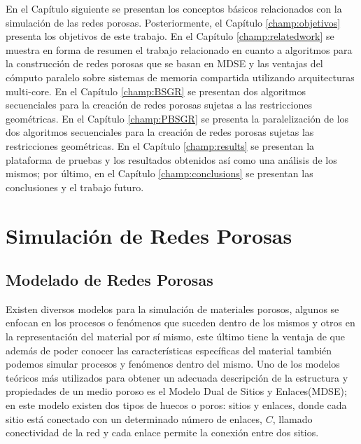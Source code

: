
En el Cap\'itulo siguiente se presentan los conceptos b\'asicos relacionados con la simulaci\'on de las redes porosas. Posteriormente, el Cap\'itulo \ref{champ:objetivos} presenta los objetivos de este trabajo. En el Capítulo \ref{champ:relatedwork} se muestra en forma de resumen el trabajo relacionado en cuanto a algoritmos para la construcción de redes porosas que se basan en MDSE y las ventajas del c\'omputo paralelo sobre sistemas de memoria compartida utilizando arquitecturas multi-core. En el Capítulo \ref{champ:BSGR} se presentan dos algoritmos secuenciales para la creación de redes porosas sujetas a las restricciones geométricas. En el Capítulo \ref{champ:PBSGR} se presenta la paralelización de los dos algoritmos secuenciales para la creación de redes porosas sujetas las restricciones geométricas. En el Capítulo \ref{champ:results} se presentan la plataforma de pruebas y los resultados obtenidos así como una análisis de los mismos; por último, en el Capítulo \ref{champ:conclusions} se presentan las conclusiones y el trabajo futuro.


\chapter{Simulaci\'on de Redes Porosas}
\label{champ:construction}
\bigskip
\barra
\bigskip


\section{Modelado de Redes Porosas}
\label{sec:model}
Existen diversos modelos para la simulación de materiales porosos, algunos se enfocan en los procesos o fenómenos que suceden dentro de los mismos y otros en la representación del material por s\'i mismo, este último tiene la ventaja de que además de poder conocer las características espec\'ificas del material también podemos simular procesos y fenómenos dentro del mismo. Uno de los modelos teóricos m\'as utilizados para obtener un adecuada descripción de la estructura y propiedades de un medio poroso es el Modelo Dual de Sitios y Enlaces(MDSE)\cite{ref2}; en este modelo existen dos tipos de huecos o poros: sitios y enlaces, donde cada sitio está conectado con un determinado número de enlaces, $C$, llamado conectividad de la red y cada enlace permite la conexión entre dos sitios.\\

